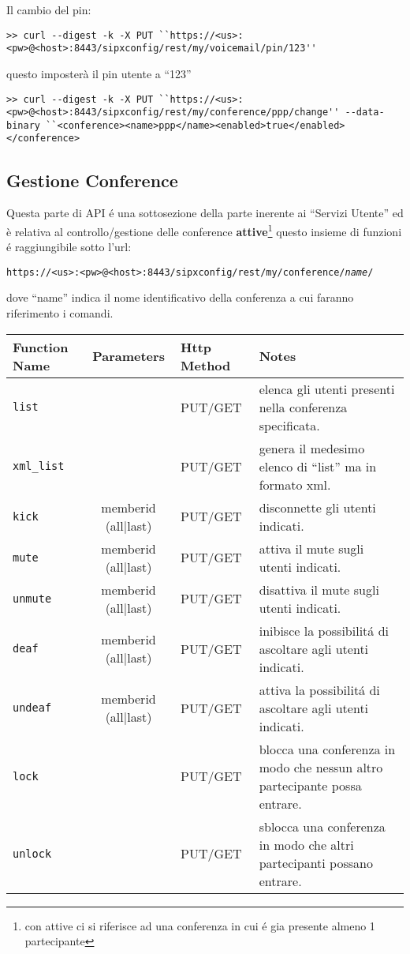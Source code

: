 Il cambio del pin:
\bigskip
\begin{lstlisting}
>> curl --digest -k -X PUT ``https://<us>:<pw>@<host>:8443/sipxconfig/rest/my/voicemail/pin/123''
\end{lstlisting}
\bigskip

questo imposter\`a il pin utente a ``123''
\bigskip
\begin{lstlisting}
>> curl --digest -k -X PUT ``https://<us>:<pw>@<host>:8443/sipxconfig/rest/my/conference/ppp/change'' --data-binary ``<conference><name>ppp</name><enabled>true</enabled></conference>
\end{lstlisting}

\subsection{Gestione Conference}

Questa parte di API \'e una sottosezione della parte inerente ai ``Servizi Utente'' ed \`e relativa al controllo/gestione delle conference 
\textbf{attive}\footnote{con attive ci si riferisce ad una conferenza in cui \'e gia presente almeno 1 partecipante}
questo insieme di funzioni \'e raggiungibile sotto l'url:

\bigskip

\texttt{https://<us>:<pw>@<host>:8443/sipxconfig/rest/my/conference/\emph{name}/}

dove ``name'' indica il nome identificativo della conferenza a cui faranno riferimento i comandi.

\bigskip

\begin{tabular}[c]{l | c || l || p{5cm}}
Function Name & Parameters & Http Method & Notes \\
\hline \hline
\texttt{list} & & PUT/GET & elenca gli utenti presenti nella conferenza specificata.\\ \hline
\texttt{xml\_list} & & PUT/GET & genera il medesimo elenco di ``list'' ma in formato xml. \\ \hline
\texttt{kick} & memberid (all|last) & PUT/GET & disconnette gli utenti indicati. \\ \hline
\texttt{mute} & memberid (all|last) & PUT/GET & attiva il mute sugli utenti indicati. \\ \hline
\texttt{unmute} & memberid (all|last) & PUT/GET & disattiva il mute sugli utenti indicati. \\ \hline
\texttt{deaf} & memberid (all|last) & PUT/GET & inibisce la possibilit\'a di ascoltare agli utenti indicati. \\ \hline
\texttt{undeaf} & memberid (all|last) & PUT/GET & attiva la possibilit\'a di ascoltare agli utenti indicati. \\ \hline
\texttt{lock} & & PUT/GET & blocca una conferenza in modo che nessun altro partecipante possa entrare. \\ \hline
\texttt{unlock} & & PUT/GET & sblocca una conferenza in modo che altri partecipanti possano entrare. \\ \hline


\end{tabular}
